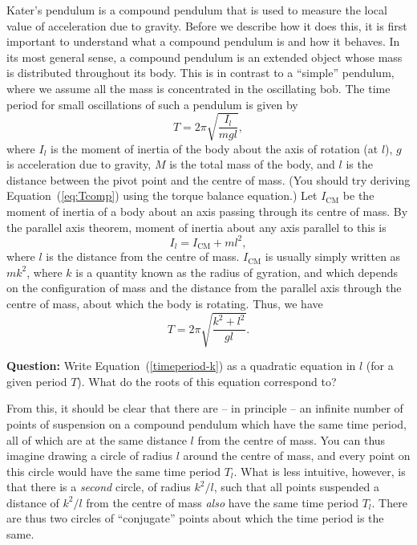 Kater's pendulum is a compound pendulum that is used to measure the local value of acceleration due to gravity. Before we describe how it does this, it is first important to understand what a compound pendulum is and how it behaves. In its most general sense, a compound pendulum is an extended object whose mass is distributed throughout its body. This is in contrast to a ``simple'' pendulum, where we assume all the mass is concentrated in the oscillating bob. The time period for small oscillations of such a pendulum is given by 
\begin{equation}
    T=2 \pi \sqrt{\frac{I_l}{mgl}},
    \label{eq:Tcomp}
\end{equation}
where $I_l$ is the moment of inertia of the body about the axis of rotation (at $l$), $g$ is acceleration due to gravity, $M$ is the total mass of the body, and $l$ is the distance between the pivot point and the centre of mass. (You should try deriving Equation~(\ref{eq:Tcomp}) using the torque balance equation.) Let $I_\text{CM}$ be the moment of inertia of a body about an axis passing through its centre of mass. By the parallel axis theorem, moment of inertia about any axis parallel to this is
\begin{equation}
    I_l=I_\text{CM}+ml^2,
    \label{parallel-axis-theorem}
\end{equation}
where $l$ is the distance from the centre of mass. $I_\text{CM}$ is usually simply written as $m k^2$, where $k$ is a quantity known as the radius of gyration, and which depends on the configuration of mass and the distance from the parallel axis through the centre of mass, about which the body is rotating. Thus, we have
\begin{equation}
    T = 2 \pi \sqrt{\frac{k^2 + l^2}{gl}}.
    \label{timeperiod-k}
\end{equation}

\begin{question}
\textbf{Question:} Write Equation~(\ref{timeperiod-k}) as a quadratic equation in $l$ (for a given period $T$). What do the roots of this equation correspond to?
\end{question}

From this, it should be clear that there are -- in principle -- an infinite number of points of suspension on a compound pendulum which have the same time period, all of which are at the same distance $l$ from the centre of mass. You can thus imagine drawing a circle of radius $l$ around the centre of mass, and every point on this circle would have the same time period $T_l$. What is less intuitive, however, is that there is a \textsl{second} circle, of radius $k^2/l$, such that all points suspended a distance of $k^2/l$ from the centre of mass \textsl{also} have the same time period $T_l$. There are thus two circles of ``conjugate'' points about which the time period is the same.

